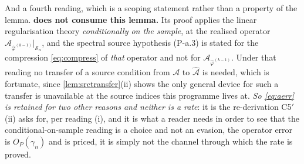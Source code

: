 \begin{lemma}
And a fourth reading, which is a scoping statement rather than a property of the lemma.
\textbf{ does not consume this lemma.} Its proof applies the linear regularisation
theory \emph{conditionally on the sample}, at the realised operator
$\hat{\mathcal A}_{\hat\varphi^{(k-1)}}\vert_{\mathcal S_n}$, and the spectral source hypothesis (P-a.3)
is stated for the compression \eqref{eq:compress} of \emph{that} operator and not for
$\mathcal A_{\hat\varphi^{(k-1)}}$. Under that reading
no transfer of a source condition from $\mathcal A$ to $\hat{\mathcal A}$ is needed, which is
fortunate, since \cref{lem:srctransfer}(ii) shows the only general device for such a transfer is
unavailable at the source indices this programme lives at. \emph{So \eqref{eq:aerr} is retained for two
other reasons and neither is a rate}: it is the re-derivation C5$'$(ii) asks for, per reading (i), and
it is what a reader needs in order to see that the conditional-on-sample reading is a choice and not an
evasion, the operator error is $O_P(\gamma_n)$ and is priced, it is simply not the channel through
which the rate is proved.
\end{lemma}

